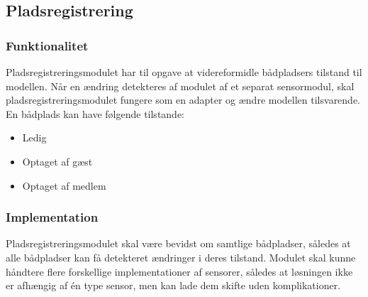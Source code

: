 \subsection{Pladsregistrering}
\label{sub:plads_registrering}

\subsubsection{Funktionalitet}
\label{ssub:plads_registrering_funktionalitet}

Pladsregistreringsmodulet har til opgave at videreformidle bådpladsers tilstand til modellen. Når en ændring detekteres af modulet af et separat sensormodul, skal pladsregistreringsmodulet fungere som en adapter og ændre modellen tilsvarende. En bådplads kan have følgende tilstande:

\begin{itemize}
  \item Ledig
  \item Optaget af gæst
  \item Optaget af medlem
\end{itemize}



\subsubsection{Implementation}
\label{ssub:plads_registrering_implementation}

Pladsregistreringsmodulet skal være bevidst om samtlige bådpladser, således at alle bådpladser kan få detekteret ændringer i deres tilstand. 
Modulet skal kunne håndtere flere forskellige implementationer af sensorer, således at løsningen ikke er afhængig af én type sensor, men kan lade dem skifte uden komplikationer.
